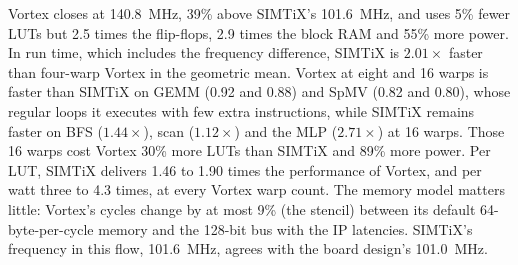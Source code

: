 \documentclass[journal]{IEEEtran}
\begin{document}
Vortex closes at 140.8~MHz, 39\% above SIMTiX's 101.6~MHz, and uses 5\% fewer
LUTs but 2.5 times the flip-flops, 2.9 times the block RAM and 55\% more power. In
run time, which includes the frequency difference, SIMTiX is $2.01\times$ faster
than four-warp Vortex in the geometric mean. Vortex at eight and 16 warps is
faster than SIMTiX on GEMM (0.92 and 0.88) and SpMV (0.82 and 0.80), whose regular
loops it executes with few extra instructions, while SIMTiX remains faster on BFS
($1.44\times$), scan ($1.12\times$) and the MLP ($2.71\times$) at 16 warps. Those
16 warps cost Vortex 30\% more LUTs than SIMTiX and 89\% more power. Per LUT,
SIMTiX delivers 1.46 to 1.90 times the performance of Vortex, and per watt three
to 4.3 times, at every Vortex warp count. The memory model matters little: Vortex's
cycles change by at most 9\% (the stencil) between its default
64-byte-per-cycle memory and the 128-bit bus with the IP latencies. SIMTiX's
frequency in this flow, 101.6~MHz, agrees with the board design's 101.0~MHz.
\end{document}
